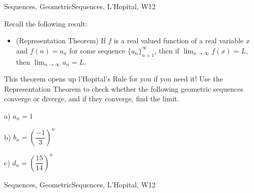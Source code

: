 \begin{tagblock}{Sequences, GeometricSequences, L'Hopital, W12}
\begin{question}

Recall the following result:

\bigskip

\begin{itemize} 



\item (Representation Theorem) If $f$ is a real valued function of a real variable $x$ and $f(n)=a_n$ for some sequence $\{a_n\}_{n=1}^{\infty}$, then if $\displaystyle\lim_{x\to\infty}f(x)=L$, then $\displaystyle\lim_{n\to\infty}a_n=L$.

\end{itemize}

This theorem opens up l'Hopital's Rule for you if you need it! Use the Representation Theorem to check whether the following geometric sequences converge or diverge, and if they converge, find the limit.

\bigskip

a) $a_n=1$

\bigskip

b) $b_n=\left(\dfrac{-1}{3}\right)^n$

\bigskip

c) $d_n=\left(\dfrac{15}{14}\right)^n$

	
	
\begin{tags}
	    Sequences, GeometricSequences, L'Hopital, W12
\end{tags}
	
\begin{diary}
	   
\end{diary}
	
\begin{solution}	

\end{solution}
	
\end{question}

\end{tagblock}





